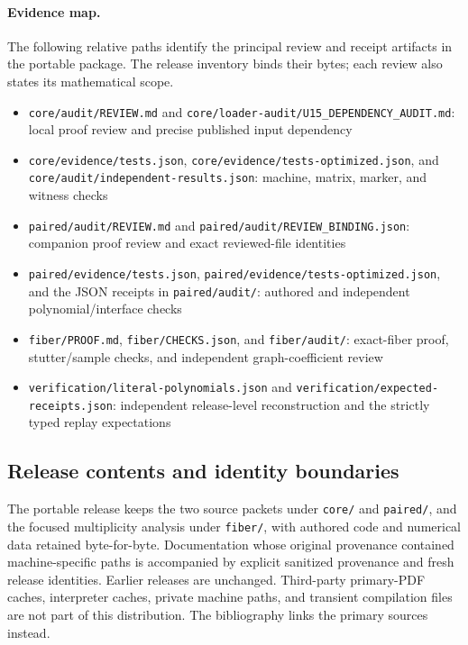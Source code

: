 \documentclass[11pt,letterpaper]{article}
\theoremstyle{definition}
\theoremstyle{remark}
\newcommand{\code}[1]{\nolinkurl{#1}}
\begin{document}
\paragraph{Evidence map.}
The following relative paths identify the principal review and receipt artifacts in the portable package. The release inventory binds their bytes; each review also states its mathematical scope.
\begin{itemize}
\item \code{core/audit/REVIEW.md} and \code{core/loader-audit/U15_DEPENDENCY_AUDIT.md}: local proof review and precise published input dependency
\item \code{core/evidence/tests.json}, \code{core/evidence/tests-optimized.json}, and \code{core/audit/independent-results.json}: machine, matrix, marker, and witness checks
\item \code{paired/audit/REVIEW.md} and \code{paired/audit/REVIEW_BINDING.json}: companion proof review and exact reviewed-file identities
\item \code{paired/evidence/tests.json}, \code{paired/evidence/tests-optimized.json}, and the JSON receipts in \code{paired/audit/}: authored and independent polynomial/interface checks
\item \code{fiber/PROOF.md}, \code{fiber/CHECKS.json}, and \code{fiber/audit/}: exact-fiber proof, stutter/sample checks, and independent graph-coefficient review
\item \code{verification/literal-polynomials.json} and \code{verification/expected-receipts.json}: independent release-level reconstruction and the strictly typed replay expectations
\end{itemize}

\subsection{Release contents and identity boundaries}
The portable release keeps the two source packets under \code{core/} and \code{paired/}, and the focused multiplicity analysis under \code{fiber/}, with authored code and numerical data retained byte-for-byte. Documentation whose original provenance contained machine-specific paths is accompanied by explicit sanitized provenance and fresh release identities. Earlier releases are unchanged. Third-party primary-PDF caches, interpreter caches, private machine paths, and transient compilation files are not part of this distribution. The bibliography links the primary sources instead.
\end{document}
